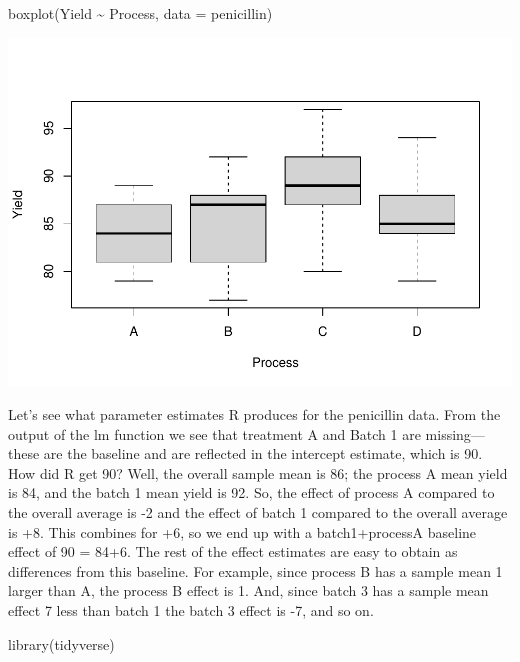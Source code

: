 \documentclass[
]{book}
\newenvironment{Shaded}{\begin{snugshade}}{\end{snugshade}}
\newcommand{\AttributeTok}[1]{\textcolor[rgb]{0.77,0.63,0.00}{#1}}
\newcommand{\FunctionTok}[1]{\textcolor[rgb]{0.00,0.00,0.00}{#1}}
\newcommand{\NormalTok}[1]{#1}
\newcommand{\SpecialCharTok}[1]{\textcolor[rgb]{0.00,0.00,0.00}{#1}}
\begin{document}
\begin{Shaded}
\begin{Highlighting}[]
\FunctionTok{boxplot}\NormalTok{(Yield }\SpecialCharTok{\textasciitilde{}}\NormalTok{ Process,}
        \AttributeTok{data =}\NormalTok{ penicillin)}
\end{Highlighting}
\end{Shaded}

\includegraphics{06-RCBD_files/figure-latex/unnamed-chunk-3-1.pdf}

Let's see what parameter estimates R produces for the penicillin data. From the output of the lm function we see that treatment A and Batch 1 are missing---these are the baseline and are reflected in the intercept estimate, which is 90. How did R get 90? Well, the overall sample mean is 86; the process A mean yield is 84, and the batch 1 mean yield is 92. So, the effect of process A compared to the overall average is -2 and the effect of batch 1 compared to the overall average is +8. This combines for +6, so we end up with a batch1+processA baseline effect of 90 = 84+6. The rest of the effect estimates are easy to obtain as differences from this baseline. For example, since process B has a sample mean 1 larger than A, the process B effect is 1. And, since batch 3 has a sample mean effect 7 less than batch 1 the batch 3 effect is -7, and so on.

\begin{Shaded}
\begin{Highlighting}[]
\FunctionTok{library}\NormalTok{(tidyverse)}
\end{Highlighting}
\end{Shaded}
\end{document}
